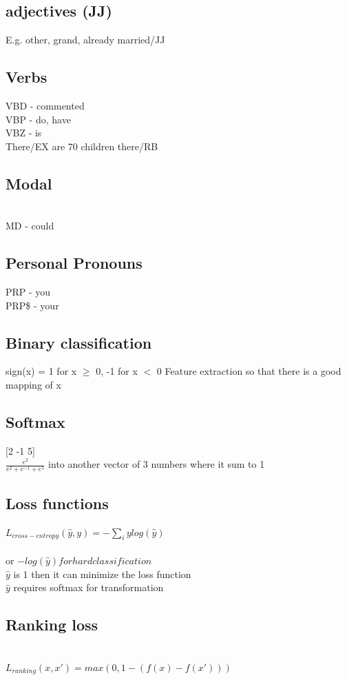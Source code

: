 \documentclass[11pt]{article}
\begin{document}
\begin{multicols*}{3}
\subsection*{adjectives (JJ)} 
E.g. other, grand, already married/JJ
\subsection*{Verbs}
VBD - commented\\
VBP - do, have\\
VBZ - is\\
There/EX are 70 children there/RB
\subsection*{Modal}\\
MD - could\\
\subsection*{Personal Pronouns}
PRP - you\\
PRP\$ - your
\subsection*{Binary classification}
sign(x) = 1 for x $\geq$ 0, -1 for x $<$ 0
Feature extraction so that there is a good mapping of x
\subsection*{Softmax}
[2 -1 5]\\
\(\frac{e^{2}}{e^{2} + e^{-1} + e^{5}}\) into another vector of 3 numbers where it sum to 1
\\
\subsection*{Loss functions}
$L_{cross-entropy} (\hat{y}, y) = - \sum\limits_{i} y log (\hat{y})$\\
\\
or $- log(\hat{y}) for hard classification$\\
$\hat{y}$ is 1 then it can minimize the loss function\\
$\hat{y}$ requires softmax for transformation\\
\subsection*{Ranking loss}\\
$L_{ranking} (x, x') = max(0, 1 - (f(x) - f(x')))$

\end{multicols*}
\end{document}
